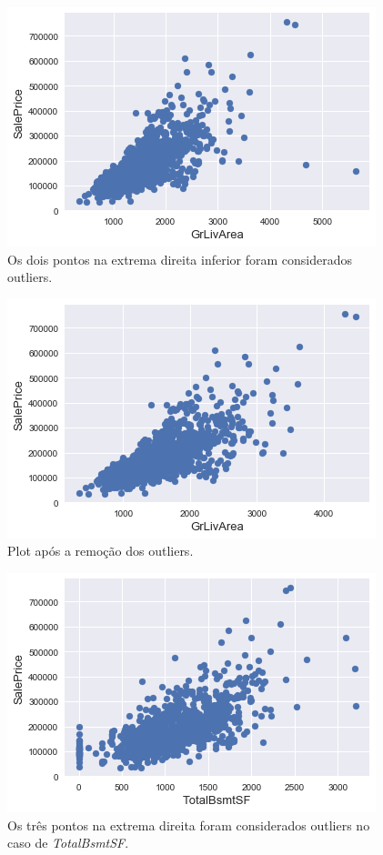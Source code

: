 \documentclass{article}
\begin{document}
			\begin{figure}[H]
				\centering
				\includegraphics[scale=0.8]{../img/grlivearea_outliers}
				\caption{Os dois pontos na extrema direita inferior foram considerados outliers.}
			\end{figure}
		
			\begin{figure}[H]
				\centering
				\includegraphics[scale=0.8]{../img/grlivearea_no_outliers}
				\caption{Plot após a remoção dos outliers.}
			\end{figure}
		
			\begin{figure}[H]
				\centering
				\includegraphics[scale=0.8]{../img/totalbsmtsf_outliers}
				\caption{Os três pontos na extrema direita foram considerados outliers no caso de \textit{TotalBsmtSF}.}
			\end{figure}
			
\end{document}
